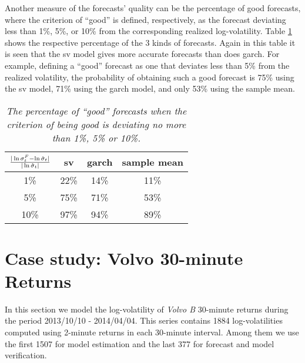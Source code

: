 Another measure of the forecasts' quality can be the percentage of good
forecasts, where the criterion of ``good'' is defined, respectively,
as the forecast deviating less than 1\%, 5\%, or 10\% from the
corresponding realized log-volatility. Table
\ref{tab:nordea_2012_good} shows the respective percentage of the 3
kinds of forecasts. Again in this table it is seen that the \gls{sv}
model gives more accurate forecasts than does \gls{garch}. For
example, defining a ``good'' forecast as one that deviates less than
5\% from the realized volatility, the probability of obtaining such a
good forecast is 75\% using the \gls{sv} model, 71\% using the
\gls{garch} model, and only 53\% using the sample mean.
\begin{table}[htb!]
  \centering
  \begin{tabular}{|c|c|c|c|}
    \hline
    ${|\ln \sigma^F_t - \ln \hat{\sigma}_t| \over |\ln \hat{\sigma}_t|}$
    & \gls{sv} & \gls{garch} & sample mean \\
    \hline
    1\% & 22\% & 14\% & 11\% \\
    \hline
    5\% & 75\% & 71\% & 53\% \\
    \hline
    10\% & 97\% & 94\% & 89\% \\
    \hline
  \end{tabular}
  \caption{\small \it The percentage of ``good'' forecasts when the
    criterion of being good is deviating no more than 1\%, 5\% or
    10\%.}
  \label{tab:nordea_2012_good}
\end{table}

\section{Case study: Volvo 30-minute Returns}
\label{sec:volvo_30}
In this section we model the log-volatility of {\it Volvo B} 30-minute
returns during the period 2013/10/10 - 2014/04/04. This series
contains 1884 log-volatilities computed using 2-minute returns in each
30-minute interval. Among them we use the first 1507 for model
estimation and the last 377 for forecast and model verification.

